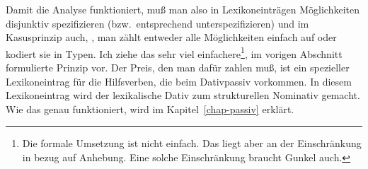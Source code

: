 \z
Damit die Analyse funktioniert, muß man also in Lexikoneinträgen Möglichkeiten disjunktiv spezifizieren (bzw.\
entsprechend unterspezifizieren) und im Kasusprinzip auch, \dash, man zählt entweder
alle Möglichkeiten einfach auf oder kodiert sie in Typen. 
Ich ziehe das sehr viel einfachere\footnote{
  Die formale Umsetzung ist nicht einfach. Das liegt aber an der Einschränkung in bezug auf Anhebung.
  Eine solche Einschränkung braucht Gunkel auch.%
}, im vorigen Abschnitt formulierte Prinzip
vor. Der Preis, den man dafür zahlen muß, ist ein spezieller
Lexikoneintrag für die Hilfsverben, die beim Dativpassiv vorkommen. In diesem Lexikoneintrag
wird der lexikalische Dativ zum strukturellen Nominativ gemacht. Wie das genau funktioniert,
wird im Kapitel~\ref{chap-passiv} erklärt.


